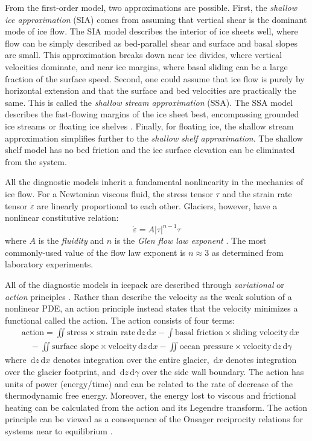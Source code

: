 \documentclass{article}
\theoremstyle{definition}
\theoremstyle{plain}
\newcommand{\ud}{\hspace{2pt}\mathrm{d}}
\begin{document}
From the first-order model, two approximations are possible.
First, the \emph{shallow ice approximation} (SIA) comes from assuming that vertical shear is the dominant mode of ice flow.
The SIA model \citep{hutter1981effect} describes the interior of ice sheets well, where flow can be simply described as bed-parallel shear and surface and basal slopes are small.
This approximation breaks down near ice divides, where vertical velocities dominate, and near ice margins, where basal sliding can be a large fraction of the surface speed.
Second, one could assume that ice flow is purely by horizontal extension and that the surface and bed velocities are practically the same.
This is called the \emph{shallow stream approximation} (SSA).
The SSA model describes the fast-flowing margins of the ice sheet best, encompassing grounded ice streams or floating ice shelves \citep{macayeal1989large}.
Finally, for floating ice, the shallow stream approximation simplifies further to the \emph{shallow shelf approximation}.
The shallow shelf model has no bed friction and the ice surface elevation can be eliminated from the system.

All the diagnostic models inherit a fundamental nonlinearity in the mechanics of ice flow.
For a Newtonian viscous fluid, the stress tensor $\tau$ and the strain rate tensor $\dot\varepsilon$ are linearly proportional to each other.
Glaciers, however, have a nonlinear constitutive relation:
\begin{equation}
    \dot\varepsilon = A|\tau|^{n - 1}\tau
\end{equation}
where $A$ is the \emph{fluidity} and $n$ is the \emph{Glen flow law exponent} \citep{cuffey2010physics}.
The most commonly-used value of the flow law exponent is $n \approx 3$ as determined from laboratory experiments.

All of the diagnostic models in icepack are described through \emph{variational} or \emph{action} principles \citep{dukowicz2010consistent}.
Rather than describe the velocity as the weak solution of a nonlinear PDE, an action principle instead states that the velocity minimizes a functional called the action.
The action consists of four terms:
\begin{align}
    & \text{action} = \iint\text{stress} \times \text{strain rate}\ud z\ud x - \int\text{basal friction} \times \text{sliding velocity}\ud x \nonumber \\
    & \quad - \iint\text{surface slope}\times\text{velocity}\ud z\ud x - \iint\text{ocean pressure}\times\text{velocity}\ud z\ud \gamma
    \label{action-functional}
\end{align}
where $\ud z\ud x$ denotes integration over the entire glacier, $\ud x$ denotes integration over the glacier footprint, and $\ud z\ud\gamma$ over the side wall boundary.
The action has units of power (energy/time) and can be related to the rate of decrease of the thermodynamic free energy.
Moreover, the energy lost to viscous and frictional heating can be calculated from the action and its Legendre transform.
The action principle can be viewed as a consequence of the Onsager reciprocity relations for systems near to equilibrium \citep{de2013non}.
\end{document}
